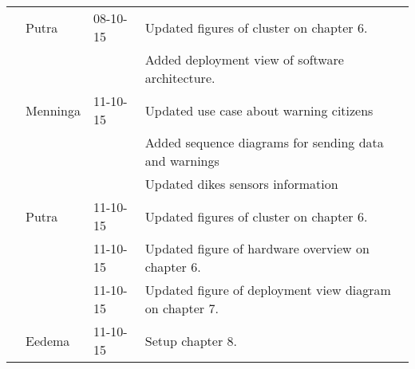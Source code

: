 \begin{longtable}{L{} L{} L{} L{}}
	                 & Putra                 & 08-10-15      & Updated figures of cluster on chapter 6.                                                                                                                                                                                   \\
	                 &                       &               & Added deployment view of software architecture.                                                                                                                                                                            \\
	                 & Menninga              & 11-10-15      & Updated use case about warning citizens                                                                                                                                                                                    \\
	                 &                       &               & Added sequence diagrams for sending data and warnings                                                                                                                                                                      \\
	                 &                       &               & Updated dikes sensors information                                                                                                                                                                                          \\
	                 & Putra                 & 11-10-15      & Updated figures of cluster on chapter 6.                                                                                                                                                                                   \\
	                 &                       & 11-10-15      & Updated figure of hardware overview on chapter 6.                                                                                                                                                                          \\
	                 &                       & 11-10-15      & Updated figure of deployment view diagram on chapter 7.                                                                                                                                                                    \\
	                 & Eedema                & 11-10-15      & Setup chapter 8.                                                                                                                                                                                                           \\

\end{longtable}
